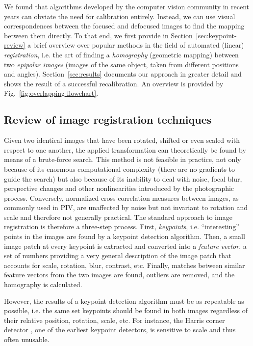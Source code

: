 \documentclass[11.5pt,oneside]{book}
\newcommand*{\figref}[1]{Fig.~\ref{#1}}
\newcommand*{\secref}[1]{Section~\ref{#1}}
\begin{document}
We found that algorithms developed by the computer
vision community in recent years can obviate the need for calibration entirely.
Instead, we can use visual correspondences between the focused and defocused
images to find the mapping between them directly. To that end, we first provide
in \secref{sec:keypoint-review} a brief overview over popular methods in the field of automated (linear)
\emph{registration}, i.e. the art of finding a \emph{homography} (geometric
mapping) between two \emph{epipolar images} (images of the same object, taken
from different positions and angles). \secref{sec:results} documents 
our approach in greater detail and shows the result of a successful
recalibration. An overview is provided by \figref{fig:overlapping-flowchart}.

\subsection{Review of image registration techniques \label{sec:keypoint-review}} Given two
identical images that have been rotated, shifted or even scaled with respect to
one another, the applied transformation can theoretically be found by means of a
brute-force search. This method is not feasible in practice, not only because of
its enormous computational complexity (there are no gradients to guide the
search) but also because of its inability to deal with noise, focal blur,
perspective changes and other nonlinearities introduced by the photographic
process. Conversely, normalized cross-correlation measures between images, as
commonly used in PIV, are unaffected by noise but not invariant to rotation and
scale and therefore not generally practical. The standard approach to image
registration is therefore a three-step process. First, \emph{keypoints}, i.e.
``interesting'' points in the images are found by a keypoint detection
algorithm.  Then, a small image patch at every keypoint is extracted and
converted into a \emph{feature vector}, a set of numbers providing a very
general description of the image patch that accounts for scale, rotation, blur,
contrast, etc. Finally, matches between similar feature vectors from the two
images are found, outliers are removed, and the homography is calculated.

However, the results of a keypoint detection algorithm
must be as repeatable as possible, i.e. the same set keypoints should be found
in both images regardless of their relative position, rotation, scale, etc. 
For instance, the Harris corner detector \cite{Harris88}, one of the earliest
keypoint detectors, is sensitive to scale and thus often unusable.
\end{document}
